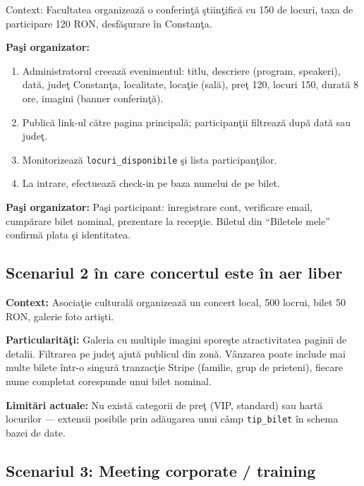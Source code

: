 Context: Facultatea organizeaz\u a o conferin\c t\u a \c stiin\c tific\u a cu 150 de locuri, taxa de participare 120 RON, desf\u a\c surare \^in Constan\c ta.

\hspace*{2ex} \textbf{Pa\c si organizator:}
\begin{enumerate}
	\item Administratorul creeaz\u a evenimentul: titlu, descriere (program, speakeri), dat\u a, jude\c t Constan\c ta, localitate, loca\c tie (sal\u a), pre\c t 120, locuri 150, durat\u a 8 ore, imagini (banner conferin\c t\u a).
	\item Public\u a link-ul c\u atre pagina principal\u a; participan\c tii filtreaz\u a dup\u a dat\u a sau jude\c t.
	\item Monitorizeaz\u a \texttt{locuri\_disponibile} \c si lista participan\c tilor.
	\item La intrare, efectueaz\u a check-in pe baza numelui de pe bilet.
\end{enumerate}

\textbf{Pa\c si organizator:} Pa\c si participant: \^inregistrare cont, verificare email, cump\u arare bilet nominal, prezentare la recep\c tie. Biletul din ``Biletele mele'' confirm\u a plata \c si identitatea.

\subsection{Scenariul 2 \^in care concertul este \^in aer liber}

\textbf{Context:} Asocia\c tie cultural\u a organizeaz\u a un concert local, 500 locrui, bilet 50 RON, galerie foto arti\c sti.

\textbf{Particularit\u a\c ti:} Galeria cu multiple imagini spore\c ste atractivitatea paginii de detalii. Filtrarea pe jude\c t ajut\u a publicul din zon\u a. V\^anzarea poate include mai multe bilete \^intr-o singur\u a tranzac\c tie Stripe (familie, grup de prieteni), fiecare nume completat corespunde unui bilet nominal.

\textbf{Limit\u ari actuale:} Nu exist\u a categorii de pre\c t (VIP, standard) sau hart\u a locurilor --- extensii posibile prin ad\u augarea unui c\^amp \texttt{tip\_bilet} \^in schema bazei de date.

\subsection{Scenariul 3: Meeting corporate / training}

